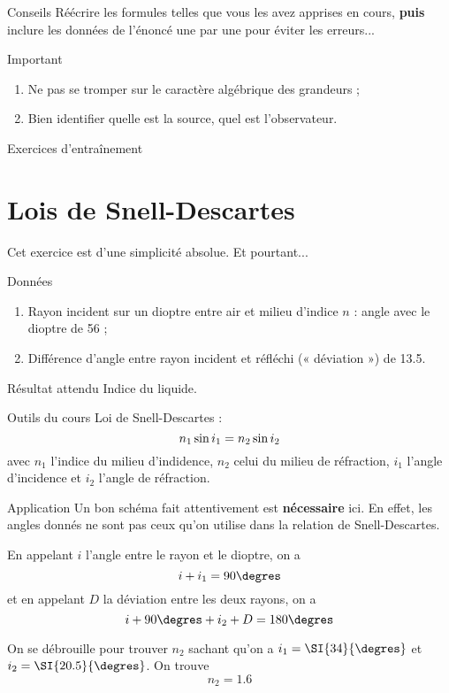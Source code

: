 \documentclass[10pt,a5paper,notitlepage]{book}
\begin{document}
\begin{NCcoro}{Conseils}
    Réécrire les formules telles que vous les avez apprises en cours,
    \textbf{puis} inclure les données de l'énoncé une par une pour éviter les
    erreurs...
\end{NCcoro}

\begin{NCimpo}{Important}
    \begin{enumerate}
        \item Ne pas se tromper sur le caractère {\huge algébrique} des
            grandeurs ;
        \item Bien identifier quelle est la source, quel est l'observateur.
    \end{enumerate}
\end{NCimpo}

\begin{center}
    \Huge Exercices d'entraînement
\end{center}

\section{Lois de Snell-Descartes}
Cet exercice est d'une simplicité absolue. Et pourtant...
\begin{NCdefi}{Données}
    \begin{enumerate}
        \item Rayon incident sur un dioptre entre air et milieu d'indice $n$ :
            angle {\huge avec le dioptre} de \SI{56}{\degres} ;
        \item Différence d'angle entre rayon incident et réfléchi (« déviation
            ») de \SI{13.5}{\degres}.
    \end{enumerate}
\end{NCdefi}

\begin{NCprop}{Résultat attendu}
    Indice du liquide.
\end{NCprop}

\begin{NCdemo}{Outils du cours}
    Loi de Snell-Descartes :
    \[ n_1\ss i_1 = n_2 \ss i_2 \]
    avec $n_1$ l'indice du milieu d'indidence, $n_2$ celui du milieu de
    réfraction, $i_1$ l'angle d'incidence et $i_2$ l'angle de réfraction.
\end{NCdemo}

\begin{NCexem}{Application}
    Un bon schéma fait attentivement est \textbf{nécessaire} ici. En effet,
    les angles donnés ne sont pas ceux qu'on utilise dans la relation de
    Snell-Descartes. \bigbreak
    
    En appelant $i$ l'angle entre le rayon et le dioptre, on a
    \[ i + i_1 = 90\degres\]
    et en appelant $D$ la déviation entre les deux rayons, on a
    \[ i + 90\degres + i_2 + D = 180\degres\]

    On se débrouille pour trouver $n_2$ sachant qu'on a $i_1 = \SI{34}{\degres}$
    et $i_2 = \SI{20.5}{\degres}$. On trouve
    \[ \boxed{n_2 = 1.6} \]
\end{NCexem}
\end{document}
